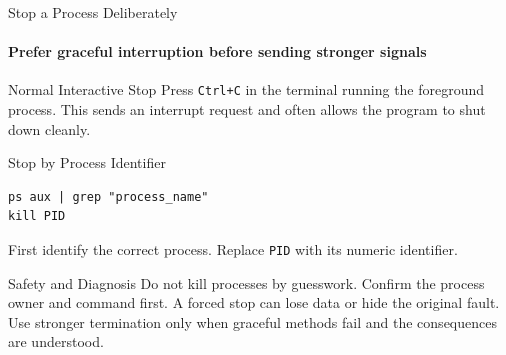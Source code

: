 \begin{frame}[fragile]{Stop a Process Deliberately}
\framesubtitle{Prefer graceful interruption before sending stronger signals}

\footnotesize

\begin{block}{Normal Interactive Stop}
Press \texttt{Ctrl+C} in the terminal running the foreground process. This sends
an interrupt request and often allows the program to shut down cleanly.
\end{block}

\begin{exampleblock}{Stop by Process Identifier}
\begin{verbatim}
ps aux | grep "process_name"
kill PID
\end{verbatim}
First identify the correct process. Replace \texttt{PID} with its numeric identifier.
\end{exampleblock}

\begin{alertblock}{Safety and Diagnosis}
Do not kill processes by guesswork. Confirm the process owner and command first.
A forced stop can lose data or hide the original fault. Use stronger termination
only when graceful methods fail and the consequences are understood.
\end{alertblock}
\end{frame}

